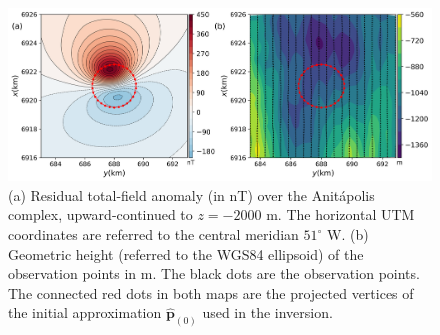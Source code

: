 \begin{figure}
    \centering
    \includegraphics[width=\linewidth]{figures/real_updata.png}
    \caption{(a) Residual total-field anomaly (in nT) over the  
    Anit{\'a}polis complex, upward-continued to $z = -2000$ m. The horizontal UTM 
    coordinates are referred to the central meridian $ 51^\circ $ W. (b) Geometric 
    height (referred to the WGS84 ellipsoid) of the observation points in m. 
    The black dots are the observation points. The connected red dots in both maps 
    are the projected vertices of the initial approximation $\hat{\mathbf{p}}_{(0)}$ 
    used in the inversion.}
    \label{fig:real_data}
\end{figure}

